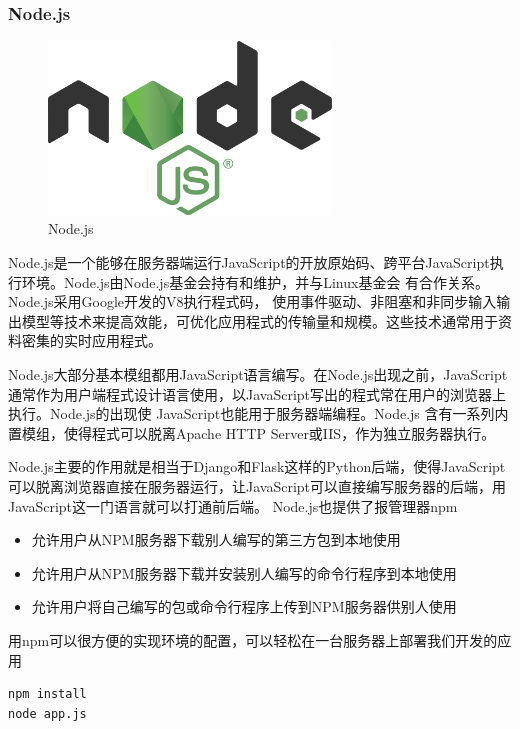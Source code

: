 \documentclass[11pt]{ctexart}
\begin{document}
\subsubsection{Node.js}
\begin{figure}[H]
    \begin{center}
    \includegraphics[width=0.67\textwidth]{figures/node.js.png}
    \caption{Node.js}
    \end{center}
\end{figure}
Node.js是一个能够在服务器端运行JavaScript的开放原始码、跨平台JavaScript执行环境。Node.js由Node.js基金会持有和维护，并与Linux基金会 有合作关系。Node.js采用Google开发的V8执行程式码，
使用事件驱动、非阻塞和非同步输入输出模型等技术来提高效能，可优化应用程式的传输量和规模。这些技术通常用于资料密集的实时应用程式。

Node.js大部分基本模组都用JavaScript语言编写。在Node.js出现之前，JavaScript通常作为用户端程式设计语言使用，以JavaScript写出的程式常在用户的浏览器上执行。Node.js的出现使
JavaScript也能用于服务器端编程。Node.js 含有一系列内置模组，使得程式可以脱离Apache HTTP Server或IIS，作为独立服务器执行。

Node.js主要的作用就是相当于Django和Flask这样的Python后端，使得JavaScript可以脱离浏览器直接在服务器运行，让JavaScript可以直接编写服务器的后端，用JavaScript这一门语言就可以打通前后端。
Node.js也提供了报管理器npm
\begin{itemize}
	\item 允许用户从NPM服务器下载别人编写的第三方包到本地使用
	\item 允许用户从NPM服务器下载并安装别人编写的命令行程序到本地使用
	\item 允许用户将自己编写的包或命令行程序上传到NPM服务器供别人使用
\end{itemize}
用npm可以很方便的实现环境的配置，可以轻松在一台服务器上部署我们开发的应用
\begin{verbatim}
npm install
node app.js
\end{verbatim}
\end{document}
